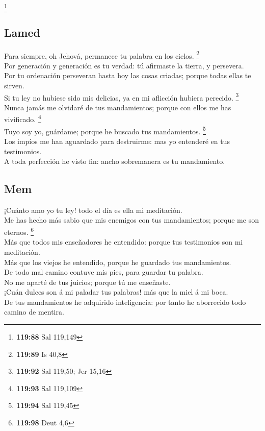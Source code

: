 \footnote{\textbf{119:88} Sal 119,149}

\hypertarget{lamed}{%
\subsection{Lamed}\label{lamed}}

 Para siempre, oh Jehová, permanece tu palabra en los
cielos. \footnote{\textbf{119:89} Is 40,8}\\
 Por generación y generación es tu verdad: tú afirmaste la
tierra, y persevera.\\
 Por tu ordenación perseveran hasta hoy las cosas criadas;
porque todas ellas te sirven.\\
 Si tu ley no hubiese sido mis delicias, ya en mi aflicción
hubiera perecido. \footnote{\textbf{119:92} Sal 119,50; Jer 15,16}\\
 Nunca jamás me olvidaré de tus mandamientos; porque con
ellos me has vivificado. \footnote{\textbf{119:93} Sal 119,109}\\
 Tuyo soy yo, guárdame; porque he buscado tus mandamientos.
\footnote{\textbf{119:94} Sal 119,45}\\
 Los impíos me han aguardado para destruirme: mas yo
entenderé en tus testimonios.\\
 A toda perfección he visto fin: ancho sobremanera es tu
mandamiento.

\hypertarget{mem}{%
\subsection{Mem}\label{mem}}

 ¡Cuánto amo yo tu ley! todo el día es ella mi
meditación.\\
 Me has hecho más sabio que mis enemigos con tus
mandamientos; porque me son eternos. \footnote{\textbf{119:98} Deut 4,6}\\
 Más que todos mis enseñadores he entendido: porque tus
testimonios son mi meditación.\\
 Más que los viejos he entendido, porque he guardado tus
mandamientos.\\
 De todo mal camino contuve mis pies, para guardar tu
palabra.\\
 No me aparté de tus juicios; porque tú me enseñaste.\\
 ¡Cuán dulces son á mi paladar tus palabras! más que la
miel á mi boca.\\
 De tus mandamientos he adquirido inteligencia: por tanto
he aborrecido todo camino de mentira.

